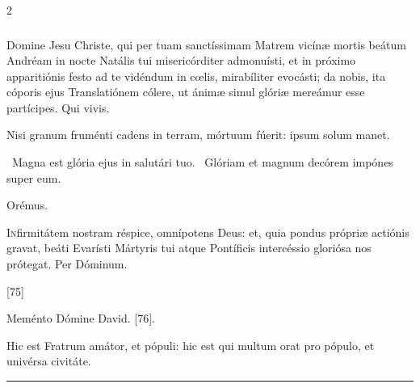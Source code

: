 \documentclass[9pt,twoside]{extarticle}
\begin{document}
\begin{multicols}{2}
\subsubsection*{\center {}}
\lettrine{D}omine Jesu Christe, qui per tuam sanctíssimam Matrem vicínæ mortis beátum Andréam in nocte Natális tui misericórditer admonuísti, et in próximo apparitiónis festo ad te vidéndum in cœlis, mirabíliter evocásti; da nobis, ita cóporis ejus Translatiónem cólere, ut ánimæ simul glóriæ mereámur esse partícipes. Qui vivis.

\begin{tightlist}{}
\item {} Nisi granum fruménti cadens in terram, mórtuum fúerit: ipsum solum manet.
\item {}~Magna est glória ejus in salutári tuo. ~Glóriam et magnum decórem impónes super eum.
\item Orémus. \hfill {}
\end{tightlist}
\lettrine{I}nfirmitátem nostram réspice, omnípotens Deus: et, quia pondus própriæ actiónis gravat, beáti Evarísti Mártyris tui atque Pontíficis intercéssio gloriósa nos prótegat. Per Dóminum.

\begin{tightlist}{}
\item {} [75]
\item {} Meménto Dómine David. [76].
\item {}
\item {} Hic est Fratrum amátor, et pópuli: hic est qui multum orat pro pópulo, et univérsa civitáte.
\end{tightlist}

\begin{center}\textcolor{red}{\rule{\linewidth}{0.5pt}} \end{center}

\subsubsection*{\center \textsc{}}

\end{multicols}
\end{document}
